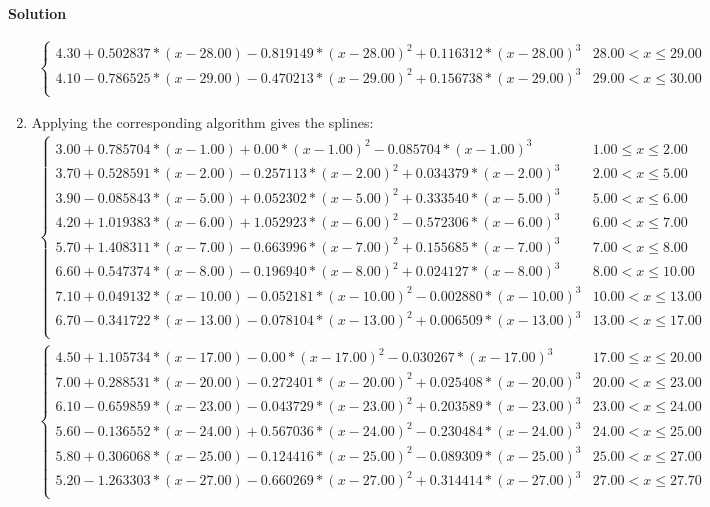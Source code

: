 \documentclass[8pt]{article} %
\newenvironment{solution}%
{\par\textbf{Solution}\space }%
{\par}
\begin{document}
\begin{solution}
\begin{enumerate}[label=(\alph*)]
{\begin{gather*}
\begin{cases}
					4.30+0.502837*(x-28.00)-0.819149*(x-28.00)^2+0.116312*(x-28.00)^3&  28.00<x\leq 29.00\\
					4.10-0.786525*(x-29.00)-0.470213*(x-29.00)^2+0.156738*(x-29.00)^3&  29.00<x\leq 30.00\\
				\end{cases}
			\end{gather*}
			}
		\item{Applying the corresponding algorithm gives the splines:\\
			\begin{gather*}
				\begin{cases}
					3.00+0.785704*(x-1.00)+0.00*(x-1.00)^2-0.085704*(x-1.00)^3&  1.00\leq x\leq 2.00\\
					3.70+0.528591*(x-2.00)-0.257113*(x-2.00)^2+0.034379*(x-2.00)^3&  2.00<x\leq 5.00\\
					3.90-0.085843*(x-5.00)+0.052302*(x-5.00)^2+0.333540*(x-5.00)^3&  5.00<x\leq 6.00\\
					4.20+1.019383*(x-6.00)+1.052923*(x-6.00)^2-0.572306*(x-6.00)^3&  6.00<x\leq 7.00\\
					5.70+1.408311*(x-7.00)-0.663996*(x-7.00)^2+0.155685*(x-7.00)^3&  7.00<x\leq 8.00\\
					6.60+0.547374*(x-8.00)-0.196940*(x-8.00)^2+0.024127*(x-8.00)^3&  8.00<x\leq 10.00\\
					7.10+0.049132*(x-10.00)-0.052181*(x-10.00)^2-0.002880*(x-10.00)^3&  10.00<x\leq 13.00\\
					6.70-0.341722*(x-13.00)-0.078104*(x-13.00)^2+0.006509*(x-13.00)^3&  13.00<x\leq 17.00\\
				\end{cases}\\
				\begin{cases}
					4.50+1.105734*(x-17.00)-0.00*(x-17.00)^2-0.030267*(x-17.00)^3&  17.00\leq x\leq 20.00\\
					7.00+0.288531*(x-20.00)-0.272401*(x-20.00)^2+0.025408*(x-20.00)^3&  20.00<x\leq 23.00\\
					6.10-0.659859*(x-23.00)-0.043729*(x-23.00)^2+0.203589*(x-23.00)^3&  23.00<x\leq 24.00\\
					5.60-0.136552*(x-24.00)+0.567036*(x-24.00)^2-0.230484*(x-24.00)^3&  24.00<x\leq 25.00\\
					5.80+0.306068*(x-25.00)-0.124416*(x-25.00)^2-0.089309*(x-25.00)^3&  25.00<x\leq 27.00\\
					5.20-1.263303*(x-27.00)-0.660269*(x-27.00)^2+0.314414*(x-27.00)^3&  27.00<x\leq 27.70\\

\end{cases}
\end{gather*}}
\end{enumerate}
\end{solution}
\end{document}
